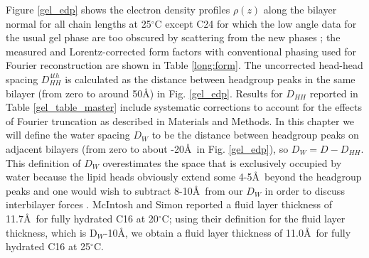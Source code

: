 Figure \ref{gel_edp} shows the electron density profiles ${\rho}(z)$ along the
bilayer normal for all chain lengths at 25$^{\circ}$C except C24 for which the
low angle data for the usual gel phase are too obscured by 
scattering from the new
phases \cite{Sun95}; the measured and Lorentz-corrected form factors with
conventional phasing used for Fourier reconstruction are shown in 
Table \ref{long:form}.  The uncorrected head-head spacing
$D_{HH}^{4th}$ is calculated as the distance between headgroup peaks in the
same bilayer (from zero to around 
50\AA) in Fig. \ref{gel_edp}.
Results for $D_{HH}$ reported in Table \ref{gel_table_master} include 
systematic corrections
to account for the effects of Fourier truncation as described in
Materials and Methods.
In this chapter we will define the water spacing $D_W$ to be the distance
between 
headgroup peaks on adjacent bilayers (from zero to about -20\AA\ 
in Fig. \ref{gel_edp}), so $D_{W} = D - D_{HH}$.  This definition of $D_W$ overestimates 
the space that is exclusively occupied by water because 
the lipid heads obviously
extend some 4-5\AA\ beyond the headgroup peaks and one would wish to
subtract 8-10\AA\ from our $D_{W}$ in order to discuss interbilayer
forces \cite{Mc&S86B,McI89}.
McIntosh and Simon \cite{Mc&S86B} reported
a fluid layer thickness of 11.7\AA\ for fully hydrated C16 at 20$^{\circ}$C;
using their definition for the fluid layer thickness, which is D$_W$-10\AA, 
we obtain a fluid layer thickness of 11.0\AA\ for fully hydrated C16 at 
25$^{\circ}$C.

